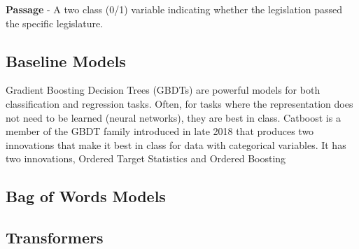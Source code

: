 \documentclass[11pt]{article}
\begin{document}
\textbf{Passage} - A two class (0/1) variable indicating whether the legislation passed the specific legislature. 


\subsection{Baseline Models}

Gradient Boosting Decision Trees (GBDTs) are powerful models for both classification and regression tasks. Often, for tasks where the representation does not
need to be learned (neural networks), they are best in class. Catboost is a member of the GBDT family introduced in late 2018 that produces two innovations
that make it best in class for data with categorical variables. It has two innovations, Ordered Target Statistics and Ordered Boosting

\subsection{Bag of Words Models}

\subsection{Transformers}







\end{document}

